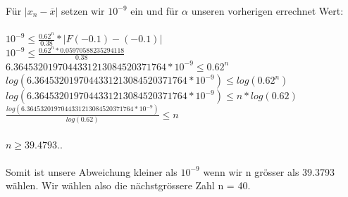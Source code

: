 \documentclass{article}
\begin{document}
Für \( |x_n - \overline{x}| \) setzen wir \( 10^{-9} \) ein und für \( \alpha \) unseren vorherigen errechnet Wert:\\\\
\( 10^{-9} \leq \frac{0.62^n}{0.38} * |F(-0.1) - (-0.1)| \)\\
\( 10^{-9} \leq \frac{0.62^n * 0.05970588235294118}{0.38} \)\\
\( 6.3645320197044331213084520371764 * 10^{-9} \leq 0.62^n \)\\
\( log(6.3645320197044331213084520371764 * 10^{-9}) \leq log(0.62^n) \)\\
\( log(6.3645320197044331213084520371764 * 10^{-9}) \leq n * log(0.62) \)\\
\( \frac{log(6.3645320197044331213084520371764 * 10^{-9})}{log(0.62)} \leq n \)\\\\
\( n \geq 39.4793.. \)\\\\
Somit ist unsere Abweichung kleiner als \( 10^{-9} \) wenn wir n grösser als 39.3793 wählen. Wir wählen also die nächstgrössere Zahl n = 40.
\end{document}
